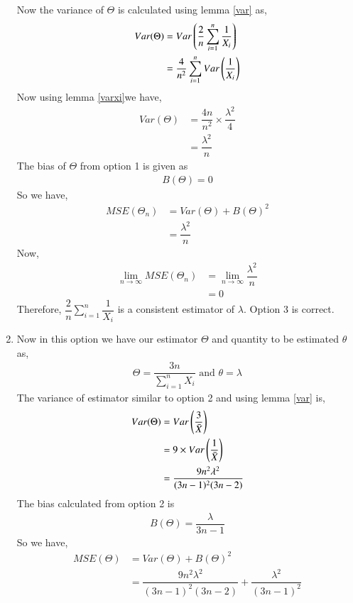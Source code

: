 \documentclass[journal,12pt,twocolumn]{IEEEtran}
\theoremstyle{definition}
\begin{document}
\begin{enumerate}
Now the variance of $ \Theta$ is calculated using lemma \ref{var} as,
\begin{align}
    Var(\Theta) &= Var\left(\dfrac{2}{n} \sum_{i=1}^{n} \dfrac{1}{X_i} \right) \\
    & = \dfrac{4}{n^2} \sum_{i=1}^{n} Var\left(\dfrac{1}{X_i}\right) 
    \label{eq3}
\end{align}
Now using lemma \ref{varxi}we have,
\begin{align}
 Var(\Theta)   & = \dfrac{4n}{n^2} \times \dfrac{\lambda^2}{4} \\
    &= \dfrac{\lambda^2}{n}
\end{align}
The bias of $ \Theta $ from option 1 is given as
\begin{align}
    B(\Theta) = 0
\end{align}
So we have,
\begin{align}
    MSE(\Theta_n) &= Var(\Theta) + B(\Theta)^2 \\
    &= \dfrac{\lambda^2}{n}
\end{align}
Now,
\begin{align}
     \lim_{n\to\infty} MSE( \Theta_n) &=    \lim_{n\to\infty} \dfrac{\lambda^2}{n} \\
      &= 0
\end{align}
Therefore, $\dfrac{2}{n} \sum_{i=1}^{n} \dfrac{1}{X_i} $ is a consistent estimator of $ \lambda$. 
Option 3 is correct. \\
\item 
 Now in this option we have our estimator $ \Theta$ and quantity to be estimated $ \theta $ as,
 \begin{align}
     \Theta = \dfrac{3n}{\sum_{i=1}^{n} X_i } \text{  and  }
     \theta = \lambda
 \end{align}
 The variance of estimator similar to option 2 and using lemma \ref{var} is,
 \begin{align}
     Var(\Theta) &= Var\left(\dfrac{3}{\Bar{X}}\right)\\
     &= 9 \times Var\left(\dfrac{1}{\Bar{X}}\right)\\
     &=  \dfrac{9n^2\lambda^2}{(3n-1)^2(3n-2)}
 \end{align}
The bias calculated from option 2 is 
\begin{align}
    B(\Theta) = \dfrac{\lambda}{3n-1}
\end{align}
So we have, 
\begin{align}
    MSE(\Theta) &= Var(\Theta) + B(\Theta)^2 \\
    &= \dfrac{9n^2\lambda^2}{(3n-1)^2(3n-2)} + \dfrac{\lambda^2}{(3n-1)^2}

\end{align}
\end{enumerate}
\end{document}
